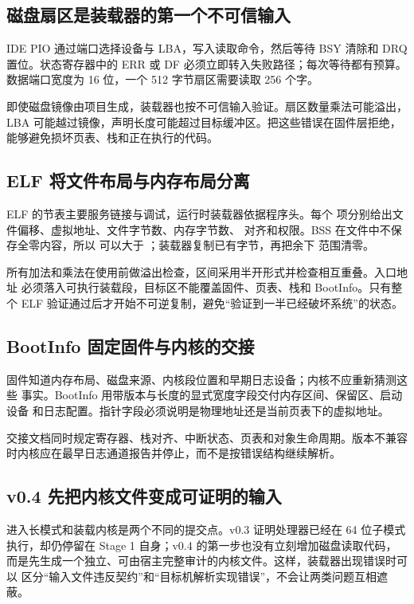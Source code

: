 \subsection{磁盘扇区是装载器的第一个不可信输入}

IDE PIO 通过端口选择设备与 LBA，写入读取命令，然后等待 BSY 清除和 DRQ
置位。状态寄存器中的 ERR 或 DF 必须立即转入失败路径；每次等待都有预算。
数据端口宽度为 16 位，一个 512 字节扇区需要读取 256 个字。

即使磁盘镜像由项目生成，装载器也按不可信输入验证。扇区数量乘法可能溢出，
LBA 可能越过镜像，声明长度可能超过目标缓冲区。把这些错误在固件层拒绝，
能够避免损坏页表、栈和正在执行的代码。

\subsection{ELF 将文件布局与内存布局分离}

ELF 的节表主要服务链接与调试，运行时装载器依据程序头。每个
 项分别给出文件偏移、虚拟地址、文件字节数、内存字节数、
对齐和权限。BSS 在文件中不保存全零内容，所以
 可以大于 ；装载器复制已有字节，再把余下
范围清零。

所有加法和乘法在使用前做溢出检查，区间采用半开形式并检查相互重叠。入口地址
必须落入可执行装载段，目标区不能覆盖固件、页表、栈和 BootInfo。只有整个
ELF 验证通过后才开始不可逆复制，避免“验证到一半已经破坏系统”的状态。

\subsection{BootInfo 固定固件与内核的交接}

固件知道内存布局、磁盘来源、内核段位置和早期日志设备；内核不应重新猜测这些
事实。BootInfo 用带版本与长度的显式宽度字段交付内存区间、保留区、启动设备
和日志配置。指针字段必须说明是物理地址还是当前页表下的虚拟地址。

交接文档同时规定寄存器、栈对齐、中断状态、页表和对象生命周期。版本不兼容
时内核应在最早日志通道报告并停止，而不是按错误结构继续解析。

\subsection{v0.4 先把内核文件变成可证明的输入}

进入长模式和装载内核是两个不同的提交点。v0.3 证明处理器已经在 64 位子模式
执行，却仍停留在 Stage 1 自身；v0.4 的第一步也没有立刻增加磁盘读取代码，
而是先生成一个独立、可由宿主完整审计的内核文件。这样，装载器出现错误时可以
区分“输入文件违反契约”和“目标机解析实现错误”，不会让两类问题互相遮蔽。

